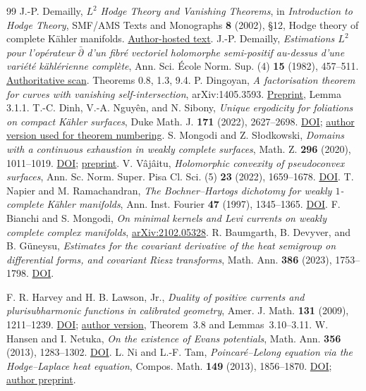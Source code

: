 \documentclass[11pt]{article}
\theoremstyle{remark}
\begin{document}
\begin{thebibliography}{99}
J.-P. Demailly, \emph{$L^2$ Hodge Theory and Vanishing Theorems}, in \emph{Introduction to Hodge Theory}, SMF/AMS Texts and Monographs \textbf{8} (2002), \S12, Hodge theory of complete K\"ahler manifolds.
\href{https://www-fourier.univ-grenoble-alpes.fr/~demailly/manuscripts/hodge-ams.pdf}{Author-hosted text}.
J.-P. Demailly, \emph{Estimations $L^2$ pour l'op\'erateur $\bar\partial$ d'un fibr\'e vectoriel holomorphe semi-positif au-dessus d'une vari\'et\'e k\"ahl\'erienne compl\`ete}, Ann. Sci. \'Ecole Norm. Sup. (4) \textbf{15} (1982), 457--511.
\href{https://www.numdam.org/item/ASENS_1982_4_15_3_457_0/}{Authoritative scan}. Theorems 0.8, 1.3, 9.4.
P. Dingoyan, \emph{A factorisation theorem for curves with vanishing self-intersection}, arXiv:1405.3593.
\href{https://arxiv.org/abs/1405.3593}{Preprint}, Lemma 3.1.1.
T.-C. Dinh, V.-A. Nguy\^en, and N. Sibony, \emph{Unique ergodicity for foliations on compact K\"ahler surfaces}, Duke Math. J. \textbf{171} (2022), 2627--2698.
\href{https://doi.org/10.1215/00127094-2022-0044}{DOI};
\href{https://arxiv.org/pdf/1811.07450v2}{author version used for theorem numbering}.
S. Mongodi and Z. S{\l}odkowski, \emph{Domains with a continuous exhaustion in weakly complete surfaces}, Math. Z. \textbf{296} (2020), 1011--1019.
\href{https://doi.org/10.1007/s00209-020-02466-z}{DOI};
\href{https://arxiv.org/pdf/1904.03497}{preprint}.
V. V\^aj\^aitu, \emph{Holomorphic convexity of pseudoconvex surfaces}, Ann. Sc. Norm. Super. Pisa Cl. Sci. (5) \textbf{23} (2022), 1659--1678.
\href{https://doi.org/10.2422/2036-2145.202011_018}{DOI}.
T. Napier and M. Ramachandran, \emph{The Bochner--Hartogs dichotomy for weakly $1$-complete K\"ahler manifolds}, Ann. Inst. Fourier \textbf{47} (1997), 1345--1365.
\href{https://doi.org/10.5802/aif.1602}{DOI}.
F. Bianchi and S. Mongodi, \emph{On minimal kernels and Levi currents on weakly complete complex manifolds},
\href{https://arxiv.org/pdf/2102.05328}{arXiv:2102.05328}.
R. Baumgarth, B. Devyver, and B. G\"uneysu,
\emph{Estimates for the covariant derivative of the heat semigroup on differential forms, and covariant Riesz transforms},
Math. Ann. \textbf{386} (2023), 1753--1798.
\href{https://doi.org/10.1007/s00208-022-02409-5}{DOI}.

F. R. Harvey and H. B. Lawson, Jr.,
\emph{Duality of positive currents and plurisubharmonic functions in calibrated geometry},
Amer. J. Math. \textbf{131} (2009), 1211--1239.
\href{https://doi.org/10.1353/ajm.0.0074}{DOI};
\href{https://www.math.stonybrook.edu/~blaine/phiPSH-Part2.pdf}{author version},
Theorem~3.8 and Lemmas~3.10--3.11.
W. Hansen and I. Netuka, \emph{On the existence of Evans potentials},
Math. Ann. \textbf{356} (2013), 1283--1302.
\href{https://doi.org/10.1007/s00208-012-0873-2}{DOI}.
L. Ni and L.-F. Tam, \emph{Poincar\'e--Lelong equation via the
Hodge--Laplace heat equation}, Compos. Math. \textbf{149} (2013), 1856--1870.
\href{https://doi.org/10.1112/S0010437X12000322}{DOI};
\href{https://mathweb.ucsd.edu/~lni/academic/PL-1109-v1.pdf}{author preprint}.
\end{thebibliography}
\end{document}
